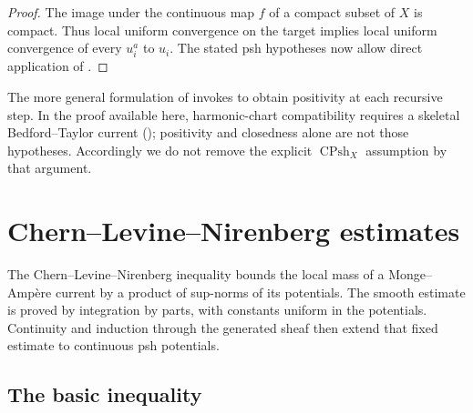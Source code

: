 \begin{proof}
The image under the continuous map $f$ of a compact subset of $X$ is compact.
Thus local uniform convergence on the target implies local uniform
convergence of every $u_i^a$ to $u_i$.  The stated psh hypotheses now allow
direct application of .
\end{proof}

The more general formulation of \cite[Proposition~8.7.3]{CLD25} invokes
\cite[Corollary~8.11.3]{CLD25} to obtain positivity at each recursive
step.  In the proof available here, harmonic-chart compatibility requires
a skeletal Bedford--Taylor current
(); positivity and closedness alone
are not those hypotheses.  Accordingly we do not remove the explicit
$\operatorname{CPsh}_X$ assumption by that argument.

\section{Chern--Levine--Nirenberg estimates}
\label{sec:ch16-cln}

The Chern--Levine--Nirenberg inequality \cite{CLN69} bounds the local mass of
a Monge--Amp\`ere current by a product of sup-norms of its potentials.
The smooth estimate is proved by integration by parts, with constants
uniform in the potentials.  Continuity and induction through the generated
sheaf then extend that fixed estimate to continuous psh potentials.

\subsection{The basic inequality}
\label{sec:ch16-cln-basic}

